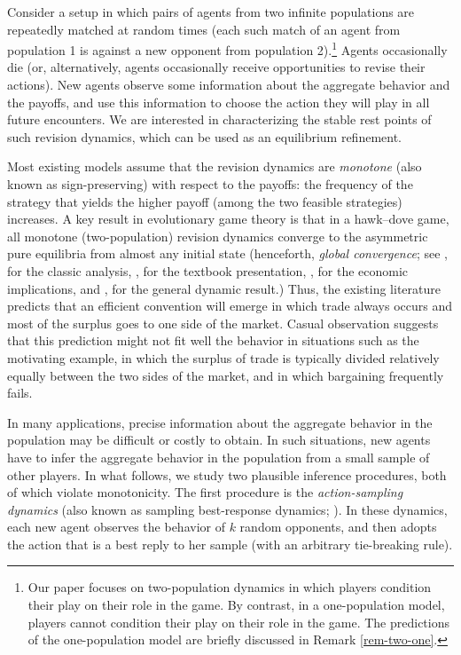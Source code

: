 \documentclass[12pt]{article}
\numberwithin{equation}{section}
\numberwithin{figure}{section}
\theoremstyle{definition}
\theoremstyle{plain}
\theoremstyle{plain}
\theoremstyle{plain}
\theoremstyle{remark}
\theoremstyle{plain}
\theoremstyle{plain}
\begin{document}
Consider a setup in which pairs of agents from two infinite populations are repeatedly matched at random times (each such match of an agent from population 1 is against a new opponent from population 2).\footnote{Our paper focuses on two-population dynamics in which players condition their play on their role in the game. By contrast, in a one-population model, players cannot condition their play on their role in the game. The predictions of the one-population model are briefly discussed in Remark \ref{rem-two-one}.} Agents occasionally die (or, alternatively, agents occasionally receive opportunities to revise their actions). New agents observe some information about the aggregate behavior and the payoffs, and use this information to choose the action they will play in all future encounters. We are interested in characterizing the stable rest points of such revision dynamics, which can be used as an equilibrium refinement.

Most existing models assume that the revision dynamics are \emph{monotone} (also known as sign-preserving) with respect to the payoffs: the frequency of the strategy that yields the higher payoff (among the two feasible strategies) increases. A key result in evolutionary game theory is that in a hawk--dove game, all monotone
(two-population) revision dynamics converge to the asymmetric pure equilibria  from almost any initial state (henceforth, \emph{global convergence}; see \citealp{smith1976logic}, for the classic analysis, \citealp{smith1982evolution}, for the textbook presentation, \citealp{sugden1989spontaneous}, for the economic implications, and \citealp{oprea2011separating}, for the general dynamic result.)  Thus, the existing literature predicts that an efficient convention 
will emerge in which trade always occurs and most of the surplus goes to one side of the market. Casual observation suggests that this prediction might not fit well the behavior in situations such as the motivating example, in which the surplus of trade is typically divided relatively equally between the two sides of the market, and in which bargaining frequently fails.

In many applications, precise information about the aggregate behavior in the population  may be difficult or costly to obtain. In such situations, new agents have to infer the aggregate behavior in the population from a small sample of other players. 
In what follows, we 
study two plausible inference procedures, both of which violate monotonicity. The first procedure is the \emph{action-sampling dynamics} (also known as sampling best-response dynamics;  \citealp{sandholm2001almost,osborne2003sampling}). In these dynamics, each new agent observes the behavior of $k$ random opponents, and then adopts the action that is a best reply to her sample (with an arbitrary tie-breaking rule). 
\end{document}
